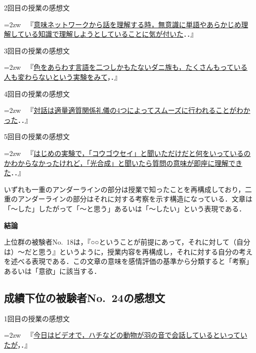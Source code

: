 \documentclass[japanese]{jnlp_1.3a}
\begin{document}
2回目の授業の感想文

\hangindent=2zw
\textbullet~『\ul{意味ネットワークから話を理解する時，無意識に単語やあらかじめ理解している知識で理解しようとしていることに気が付いた}．．』

3回目の授業の感想文

\hangindent=2zw
\textbullet~『\ul{色をあらわす言語を二つしかもたないダニ族も，たくさんもっている人も変わらないという実験をみて}，．』

4回目の授業の感想文

\hangindent=2zw
\textbullet~『\ul{対話は適量適質関係礼儀の4つによってスムーズに行われることがわかった}．．』

5回目の授業の感想文

\hangindent=2zw
\textbullet~『\ul{はじめの実験で，「コウゴウセイ」と聞いただけだと何をいっているのかわからなかったけれど，「光合成」と聞いたら質問の意味が即座に理解できた}．．』

\vspace{\baselineskip}

いずれも一重のアンダーラインの部分は授業で知ったことを再構成しており，二重のアンダーラインの部分はそれに対する考察を示す構造になっている．文章は「〜した」したがって「〜と思う」あるいは「〜したい」という表現である．

\vspace{\baselineskip}
\textbf{結論}

上位群の被験者No.~18は，『○○ということが前提にあって，それに対して（自分は）〜だと思う』というように，授業内容を再構成し，それに対する自分の考えを述べる表現である．この文章の意味を感情評価の基準から分類すると「考察」あるいは「意欲」に該当する．

\subsection{成績下位の被験者No.~24の感想文}

1回目の授業の感想文

\hangindent=2zw
\textbullet~『\ul{今日はビデオで，ハチなどの動物が羽の音で会話しているといっていたが}，．』
\end{document}
